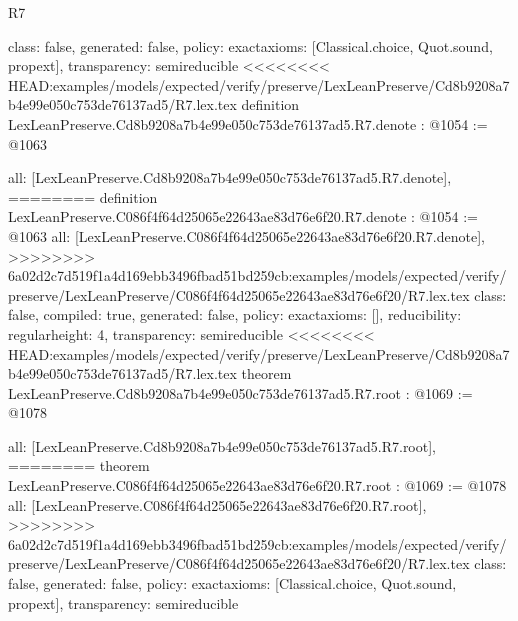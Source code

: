 \begin{lexlean}{R7}
\begin{coremodule}
{{{{{{{{{{{{  class: false,
  generated: false,
  policy: exact{axioms: [Classical.choice, Quot.sound, propext]},
  transparency: semireducible
}
<<<<<<<< HEAD:examples/models/expected/verify/preserve/LexLeanPreserve/Cd8b9208a7b4e99e050c753de76137ad5/R7.lex.tex
definition LexLeanPreserve.Cd8b9208a7b4e99e050c753de76137ad5.R7.denote : @1054 := @1063 {
  all: [LexLeanPreserve.Cd8b9208a7b4e99e050c753de76137ad5.R7.denote],
========
definition LexLeanPreserve.C086f4f64d25065e22643ae83d76e6f20.R7.denote : @1054 := @1063 {
  all: [LexLeanPreserve.C086f4f64d25065e22643ae83d76e6f20.R7.denote],
>>>>>>>> 6a02d2c7d519f1a4d169ebb3496fbad51bd259cb:examples/models/expected/verify/preserve/LexLeanPreserve/C086f4f64d25065e22643ae83d76e6f20/R7.lex.tex
  class: false,
  compiled: true,
  generated: false,
  policy: exact{axioms: []},
  reducibility: regular{height: 4},
  transparency: semireducible
}
<<<<<<<< HEAD:examples/models/expected/verify/preserve/LexLeanPreserve/Cd8b9208a7b4e99e050c753de76137ad5/R7.lex.tex
theorem LexLeanPreserve.Cd8b9208a7b4e99e050c753de76137ad5.R7.root : @1069 := @1078 {
  all: [LexLeanPreserve.Cd8b9208a7b4e99e050c753de76137ad5.R7.root],
========
theorem LexLeanPreserve.C086f4f64d25065e22643ae83d76e6f20.R7.root : @1069 := @1078 {
  all: [LexLeanPreserve.C086f4f64d25065e22643ae83d76e6f20.R7.root],
>>>>>>>> 6a02d2c7d519f1a4d169ebb3496fbad51bd259cb:examples/models/expected/verify/preserve/LexLeanPreserve/C086f4f64d25065e22643ae83d76e6f20/R7.lex.tex
  class: false,
  generated: false,
  policy: exact{axioms: [Classical.choice, Quot.sound, propext]},
  transparency: semireducible
}

}}}}}}}}}}}}}
\end{coremodule}
\end{lexlean}
